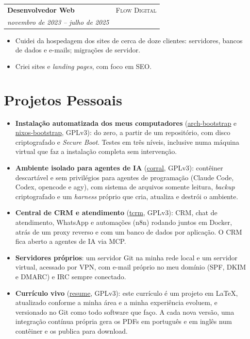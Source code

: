 \documentclass[a4paper,11pt]{article}
\makeatletter
\newcommand{\datedsubsection}[4]{%
  \vspace{0.8ex}
  \noindent\begin{tabular*}{\textwidth}{@{\extracolsep{\fill}} l r@{}}
    \textbf{#3} & \scshape{#2} \\
    \textit{#1} & \\
  \end{tabular*}\par
  \vspace{0.5ex}
  \justifying\noindent
  #4\par
}
\makeatother
\begin{document}
\datedsubsection{novembro de 2023 -- julho de 2025}{Flow Digital}%
{Desenvolvedor Web}{
  \begin{itemize}
    \item Cuidei da hospedagem dos sites de cerca de doze clientes:
    servidores, bancos de dados e e-mails; migrações de servidor.
    \item Criei sites e \textit{landing pages}, com foco em SEO.
  \end{itemize}
}


\section{Projetos Pessoais}
\begin{itemize}
  \item \textbf{Instalação automatizada dos meus computadores}
  (\href{https://github.com/librefos/arch-bootstrap}{arch-bootstrap} e
  \href{https://github.com/librefos/nixos-bootstrap}{nixos-bootstrap},
  GPLv3): do zero, a partir de um repositório, com disco criptografado e
  \textit{Secure Boot}.  Testes em três níveis, inclusive numa máquina virtual
  que faz a instalação completa sem intervenção.
  \item \textbf{Ambiente isolado para agentes de IA}
  (\href{https://github.com/librefos/corral}{corral}, GPLv3): contêiner
  descartável e sem privilégios para agentes de programação (Claude Code,
  Codex, opencode e agy), com sistema de arquivos somente leitura,
  \textit{backup} criptografado e um \textit{harness} próprio que cria,
  atualiza e destrói o ambiente.
  \item \textbf{Central de CRM e atendimento}
  (\href{https://github.com/librefos/tcrm}{tcrm}, GPLv3): CRM, chat de
  atendimento, WhatsApp e automações (n8n) rodando juntos em Docker, atrás de
  um proxy reverso e com um banco de dados por aplicação.  O CRM fica aberto a
  agentes de IA via MCP.
  \item \textbf{Servidores próprios}: um servidor Git na minha rede local e um
  servidor virtual, acessado por VPN, com e-mail próprio no meu domínio (SPF,
  DKIM e DMARC) e IRC sempre conectado.
  \item \textbf{Currículo vivo}
  (\href{https://github.com/librefos/resume}{resume}, GPLv3): este currículo
  é um projeto em \LaTeX{}, atualizado conforme a minha área e a minha
  experiência evoluem, e versionado no Git como todo software que faço.  A
  cada nova versão, uma integração contínua própria gera os PDFs em português
  e em inglês num contêiner e os publica para download.
\end{itemize}
\end{document}
